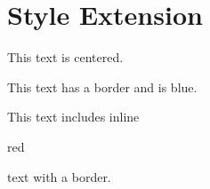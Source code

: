
\chapter{\label{style-extension}Style Extension}
\begin{center}

\par This text is centered.
\end{center}

\begin{fbox}
{\color{blue}
\par This text has a border and is blue.}
\end{fbox}

\par This text includes inline
\begin{fbox}
{\color{red}red}
\end{fbox}
 text with a border.
